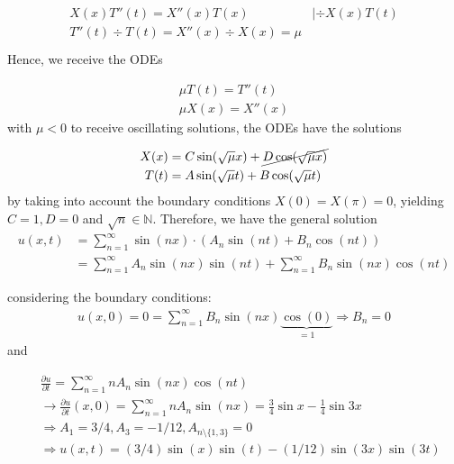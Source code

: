 \begin{align*}
    \begin{matrix}
        X(x)T''(t)=X''(x)T(x) & |\div X(x)T(t) \\
        T''(t)\div T(t) = X''(x)\div X(x) = \mu
    \end{matrix} \\
\end{align*}
Hence, we receive the ODEs

\begin{align*}
    \mu T(t) = T''(t) \\
    \mu X(x) = X''(x)
\end{align*}
with $\mu < 0$ to receive oscillating solutions, the ODEs have the solutions

\begin{align*}
    X(x) & = C \sin(\sqrt\mu x)+\cancel{ D\cos(\sqrt\mu x) } \\
    T(t) & = A \sin(\sqrt\mu t)+B \cos(\sqrt\mu t)
\end{align*}
by taking into account the boundary conditions $X(0)=X(\pi)=0$, yielding $C=1,D=0$ and $\sqrt{n}\in\mathbb{N}$.
Therefore, we have the general solution
\begin{align*}
    u(x,t) & = \sum_{n=1}^\infty \sin(nx)\cdot\left( A_n\sin(nt)+B_n\cos(nt) \right) \\
    \ & = \sum_{n=1}^\infty A_n\sin(nx)\sin(nt) + \sum_{n=1}^\infty B_n\sin(nx)\cos(nt)
\end{align*}

considering the boundary conditions:
\begin{align*}
    u(x,0) = 0 = \sum_{n=1}^\infty B_n\sin(nx)\underbrace{\cos(0)}_{=1} \Rightarrow B_n=0
\end{align*}
and

\begin{align*}
    \ & \frac{\partial u}{\partial t} = \sum_{n=1}^\infty nA_n\sin(nx)\cos(nt)\\
    \ & \rightarrow \frac{\partial u}{\partial t}(x,0) = \sum_{n=1}^\infty nA_n\sin(nx) = \frac{3}{4}\sin x-\frac{1}{4}\sin 3x \\
    \ & \Rightarrow A_1=3/4, A_3=-1/12, A_{n\setminus \{1,3\}}=0 \\
    \ & \Rightarrow u(x,t)=(3/4)\sin(x)\sin(t)-(1/12)\sin(3x)\sin(3t)
\end{align*}
